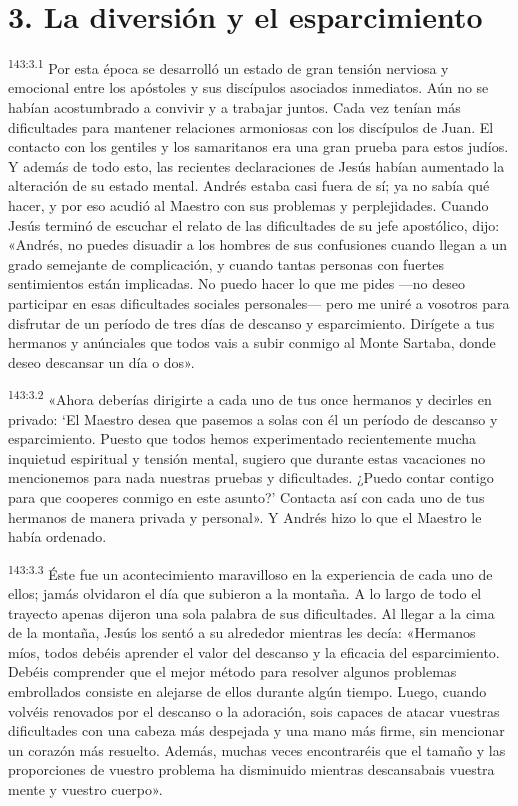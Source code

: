 \section*{3. La diversión y el esparcimiento}
\par 
\textsuperscript{143:3.1} Por esta época se desarrolló un estado de gran tensión nerviosa y emocional entre los apóstoles y sus discípulos asociados inmediatos. Aún no se habían acostumbrado a convivir y a trabajar juntos. Cada vez tenían más dificultades para mantener relaciones armoniosas con los discípulos de Juan. El contacto con los gentiles y los samaritanos era una gran prueba para estos judíos. Y además de todo esto, las recientes declaraciones de Jesús habían aumentado la alteración de su estado mental. Andrés estaba casi fuera de sí; ya no sabía qué hacer, y por eso acudió al Maestro con sus problemas y perplejidades. Cuando Jesús terminó de escuchar el relato de las dificultades de su jefe apostólico, dijo: «Andrés, no puedes disuadir a los hombres de sus confusiones cuando llegan a un grado semejante de complicación, y cuando tantas personas con fuertes sentimientos están implicadas. No puedo hacer lo que me pides ---no deseo participar en esas dificultades sociales personales--- pero me uniré a vosotros para disfrutar de un período de tres días de descanso y esparcimiento. Dirígete a tus hermanos y anúnciales que todos vais a subir conmigo al Monte Sartaba, donde deseo descansar un día o dos».

\par 
\textsuperscript{143:3.2} «Ahora deberías dirigirte a cada uno de tus once hermanos y decirles en privado: `El Maestro desea que pasemos a solas con él un período de descanso y esparcimiento. Puesto que todos hemos experimentado recientemente mucha inquietud espiritual y tensión mental, sugiero que durante estas vacaciones no mencionemos para nada nuestras pruebas y dificultades. ¿Puedo contar contigo para que cooperes conmigo en este asunto?' Contacta así con cada uno de tus hermanos de manera privada y personal». Y Andrés hizo lo que el Maestro le había ordenado.

\par 
\textsuperscript{143:3.3} Éste fue un acontecimiento maravilloso en la experiencia de cada uno de ellos; jamás olvidaron el día que subieron a la montaña. A lo largo de todo el trayecto apenas dijeron una sola palabra de sus dificultades. Al llegar a la cima de la montaña, Jesús los sentó a su alrededor mientras les decía: «Hermanos míos, todos debéis aprender el valor del descanso y la eficacia del esparcimiento. Debéis comprender que el mejor método para resolver algunos problemas embrollados consiste en alejarse de ellos durante algún tiempo. Luego, cuando volvéis renovados por el descanso o la adoración, sois capaces de atacar vuestras dificultades con una cabeza más despejada y una mano más firme, sin mencionar un corazón más resuelto. Además, muchas veces encontraréis que el tamaño y las proporciones de vuestro problema ha disminuido mientras descansabais vuestra mente y vuestro cuerpo».


